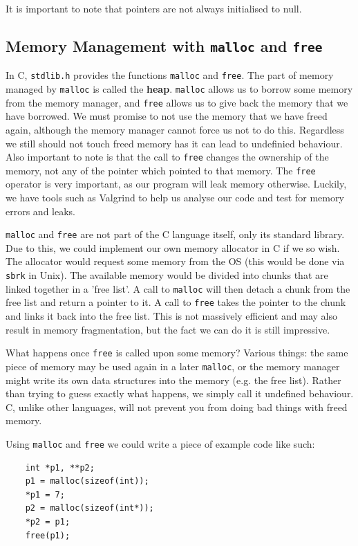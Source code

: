 \documentclass{article}
\begin{document}
	It is important to note that pointers are not always initialised to null. 
	
	\subsection{Memory Management with \texttt{malloc} and \texttt{free}}
	In C, \texttt{stdlib.h} provides the functions \texttt{malloc} and \texttt{free}. The part of memory managed by \texttt{malloc} is called the \textbf{heap}. \texttt{malloc} allows us to borrow some memory from the memory manager, and \texttt{free} allows us to give back the memory that we have borrowed. We must promise to not use the memory that we have freed again, although the memory manager cannot force us not to do this. Regardless we still should not touch freed memory has it can lead to undefinied behaviour. Also important to note is that the call to \texttt{free} changes the ownership of the memory, not any of the pointer which pointed to that memory. The \texttt{free} operator is very important, as our program will leak memory otherwise. Luckily, we have tools such as Valgrind to help us analyse our code and test for memory errors and leaks.
	
	\par 
	\texttt{malloc} and \texttt{free} are not part of the C language itself, only its standard library. Due to this, we could implement our own memory allocator in C if we so wish. The allocator would request some memory from the OS (this would be done via \texttt{sbrk} in Unix). The available memory would be divided into chunks that are linked together in a 'free list'. A call to \texttt{malloc} will then detach a chunk from the free list and return a pointer to it. A call to \texttt{free} takes the pointer to the chunk and links it back into the free list. This is not massively efficient and may also result in memory fragmentation, but the fact we can do it is still impressive.
	
	\par 
	What happens once \texttt{free} is called upon some memory? Various things: the same piece of memory may be used again in a later \texttt{malloc}, or the memory manager might write its own data structures into the memory (e.g. the free list). Rather than trying to guess exactly what happens, we simply call it undefined behaviour. C, unlike other languages, will not prevent you from doing bad things with freed memory. 
	
	Using \texttt{malloc} and \texttt{free} we could write a piece of example code like such:
	\begin{verbatim}
	int *p1, **p2;
	p1 = malloc(sizeof(int));
	*p1 = 7;
	p2 = malloc(sizeof(int*));
	*p2 = p1;
	free(p1);
	\end{verbatim}
	
\end{document}
